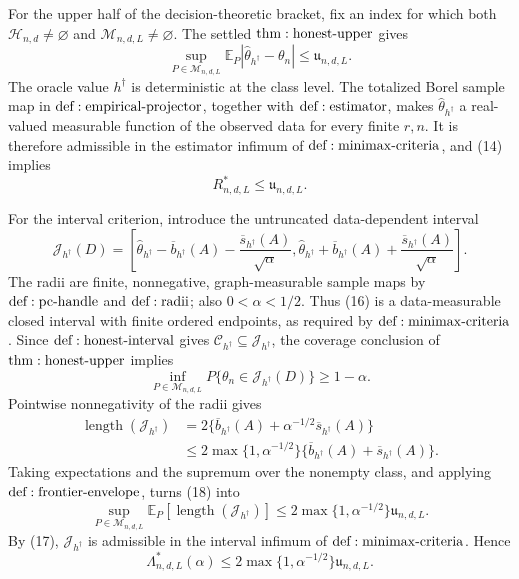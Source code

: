 For the upper half of the decision-theoretic bracket, fix an index for which both \(\mathcal H_{n,d}\ne\varnothing\) and \(\mathcal M_{n,d,L}\ne\varnothing\).  The settled \({\rm thm:honest\text{-}upper}\) gives
\[
 \sup_{P\in\mathcal M_{n,d,L}}
 \mathbb E_P|\widehat\theta_{h^\dagger}-\theta_n|
 \leq\mathfrak u_{n,d,L}.
\tag{14}
\]
The oracle value \(h^\dagger\) is deterministic at the class level.  The totalized Borel sample map in \({\rm def:empirical\text{-}projector}\), together with \({\rm def:estimator}\), makes \(\widehat\theta_{h^\dagger}\) a real-valued measurable function of the observed data for every finite \(r,n\).  It is therefore admissible in the estimator infimum of \({\rm def:minimax\text{-}criteria}\), and (14) implies
\[
 R^*_{n,d,L}\leq\mathfrak u_{n,d,L}.
\tag{15}
\]

For the interval criterion, introduce the untruncated data-dependent interval
\[
 \mathcal J_{h^\dagger}(D)=
 \left[
 \widehat\theta_{h^\dagger}-\overline b_{h^\dagger}(A)
 -\frac{\overline s_{h^\dagger}(A)}{\sqrt\alpha},
 \widehat\theta_{h^\dagger}+\overline b_{h^\dagger}(A)
 +\frac{\overline s_{h^\dagger}(A)}{\sqrt\alpha}
 \right].
\tag{16}
\]
The radii are finite, nonnegative, graph-measurable sample maps by \({\rm def:pc\text{-}handle}\) and \({\rm def:radii}\); also \(0<\alpha<1/2\).  Thus (16) is a data-measurable closed interval with finite ordered endpoints, as required by \({\rm def:minimax\text{-}criteria}\).  Since \({\rm def:honest\text{-}interval}\) gives \(\mathcal C_{h^\dagger}\subseteq\mathcal J_{h^\dagger}\), the coverage conclusion of \({\rm thm:honest\text{-}upper}\) implies
\[
 \inf_{P\in\mathcal M_{n,d,L}}
 P\{\theta_n\in\mathcal J_{h^\dagger}(D)\}\geq1-\alpha.
\tag{17}
\]
Pointwise nonnegativity of the radii gives
\[
 \begin{aligned}
 \operatorname{length}(\mathcal J_{h^\dagger})
 &=2\{\overline b_{h^\dagger}(A)
 +\alpha^{-1/2}\overline s_{h^\dagger}(A)\}\\
 &\leq2\max\{1,\alpha^{-1/2}\}
 \{\overline b_{h^\dagger}(A)+\overline s_{h^\dagger}(A)\}.
 \end{aligned}
\tag{18}
\]
Taking expectations and the supremum over the nonempty class, and applying \({\rm def:frontier\text{-}envelope}\), turns (18) into
\[
 \sup_{P\in\mathcal M_{n,d,L}}
 \mathbb E_P[\operatorname{length}(\mathcal J_{h^\dagger})]
 \leq2\max\{1,\alpha^{-1/2}\}\mathfrak u_{n,d,L}.
\tag{19}
\]
By (17), \(\mathcal J_{h^\dagger}\) is admissible in the interval infimum of \({\rm def:minimax\text{-}criteria}\).  Hence
\[
 \Lambda^*_{n,d,L}(\alpha)
 \leq2\max\{1,\alpha^{-1/2}\}\mathfrak u_{n,d,L}.
\tag{20}
\]

